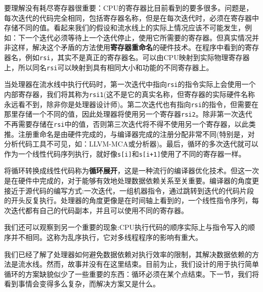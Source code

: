 要理解没有耗尽寄存器很重要：CPU的寄存器比目前看到的要多很多。问题是，每次迭代的代码完全相同，包括寄存器名称，但是在每次迭代时，必须在寄存器中存储不同的值。看起来我们的假设和流水线上的实际上情况应该不可能发生，例如：下一个迭代必须等待上一个迭代停止，使用它所需要的寄存器。但真实情况并非这样，解决这个矛盾的方法使用\textbf{寄存器重命名}的硬件技术。在程序中看到的寄存器名，例如\texttt{rsi}，其实不是真正的寄存器名。可以由CPU映射到实际物理寄存器上，所以同名\texttt{rsi}可以映射到具有相同大小和功能的不同寄存器上。

当处理器在流水线中执行代码时，第一次迭代中指向\texttt{rsi}的指令实际上会使用一个内部寄存器，我们将其称为\texttt{rsi1}(这不是它的真实名称，但寄存器的实际硬件名称永远看不到，除非你是处理器设计师)。第二次迭代也有指向\texttt{rsi}的指令，但需要在那里存储一个不同的值，因此处理器将使用另一个寄存器\texttt{rsi2}。除非第一次迭代不再需要存储在\texttt{rsi}中的值，否则第三次迭代将不得不使用另一个寄存器，以此类推。注册重命名是由硬件完成的，与编译器完成的注册分配非常不同(特别是，对分析代码工具不可见，如：LLVM-MCA或分析器)。最后，循环的多次迭代就可以作为一个线性代码序列执行，就好像\texttt{s[i]}和\texttt{s[i+1]}使用了不同的寄存器一样。

将循环转换成线性代码称为\textbf{循环展开}，这是一种流行的编译器优化技术。但这一次是在硬件中完成的，对于能够有效地处理数据依赖关系至关重要。编译器的角度更接近于源代码的编写方式:一次迭代，一组机器指令，通过跳转到迭代的代码片段的开头反复执行。处理器的角度更像是在时间轴上看到的，一个线性指令序列，每次迭代都有自己的代码副本，并且可以使用不同的寄存器。

我们还可以观察到另一个重要的现象:CPU执行代码的顺序实际上与指令写入的顺序并不相同。这称为乱序执行，它对多线程程序的影响有重大。

我们已经了解了处理器如何避免数据依赖对执行效率的限制，其解决数据依赖的方法是流水线。然而，故事并没有在这里结束。目前为止，我们设计的用于执行简单循环的方案缺貌似少了一些重要的东西：循环必须在某个点结束。下一节，我们将看到事情会变得多么复杂，而解决方案又是什么。























